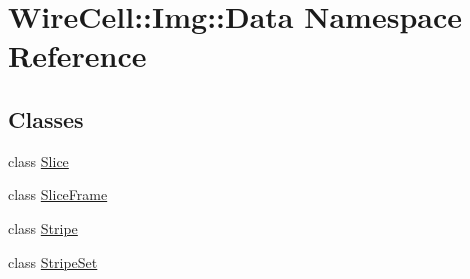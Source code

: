 \hypertarget{namespace_wire_cell_1_1_img_1_1_data}{}\section{Wire\+Cell\+:\+:Img\+:\+:Data Namespace Reference}
\label{namespace_wire_cell_1_1_img_1_1_data}
\subsection*{Classes}
\begin{DoxyCompactItemize}
\item 
class \hyperlink{class_wire_cell_1_1_img_1_1_data_1_1_slice}{Slice}
\item 
class \hyperlink{class_wire_cell_1_1_img_1_1_data_1_1_slice_frame}{Slice\+Frame}
\item 
class \hyperlink{class_wire_cell_1_1_img_1_1_data_1_1_stripe}{Stripe}
\item 
class \hyperlink{class_wire_cell_1_1_img_1_1_data_1_1_stripe_set}{Stripe\+Set}
\end{DoxyCompactItemize}
